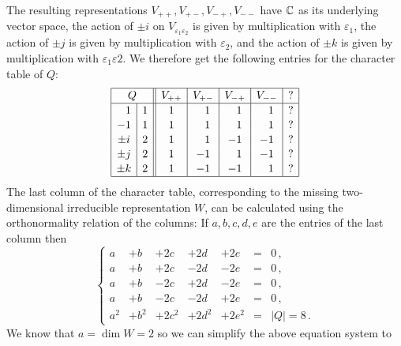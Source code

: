 \begin{example}
  The resulting representations $V_{++}, V_{+-}, V_{-+}, V_{--}$ have $\mathbb{C}$ as its underlying vector space, the action of $\pm i$ on $V_{\varepsilon_1 \varepsilon_2}$ is given by multiplication with $\varepsilon_1$, the action of $\pm j$ is given by multiplication with $\varepsilon_2$, and the action of $\pm k$ is given by multiplication with $\varepsilon_1 \varepsilon 2$.
  We therefore get the following entries for the character table of $Q$:
  \[
    \begingroup
    \renewcommand{\arraystretch}{1.1}
    \begin{array}{|c|c||c|c|c|c|c|}
      \hline
        \multicolumn{2}{|c||}{Q}
      & V_{++}
      & V_{+-}
      & V_{-+}
      & V_{--}
      & ?
      \\
      \hline
       \phantom{-}1
      & 1
      &            1
      & \phantom{-}1
      & \phantom{-}1
      & \phantom{-}1
      & ?
      \\
        -1
      & 1
      &            1
      & \phantom{-}1
      & \phantom{-}1
      & \phantom{-}1
      & ?
      \\
        \pm i
      & 2
      &            1
      & \phantom{-}1
      &           -1
      &           -1
      & ?
      \\
        \pm j
      & 2
      &            1
      &           -1
      & \phantom{-}1
      &           -1
      & ?
      \\
        \pm k
      & 2
      &            1
      &           -1
      &           -1
      & \phantom{-}1
      & ?
      \\
      \hline
    \end{array}
    \endgroup
  \]
  The last column of the character table, corresponding to the missing two-dimensional irreducible representation $W$, can be calculated using the orthonormality relation of the columns:
  If $a, b, c, d, e$ are the entries of the last column then
  \[
    \left\{
      \begin{array}{lllllcl}
        a   & + b   & + 2c    & + 2d    & + 2e    &=& 0 \,, \\
        a   & + b   & + 2c    & - 2d    & - 2e    &=& 0 \,, \\
        a   & + b   & - 2c    & + 2d    & - 2e    &=& 0 \,, \\
        a   & + b   & - 2c    & - 2d    & + 2e    &=& 0 \,, \\
        a^2 & + b^2 & + 2c^2  & + 2d^2  & + 2 e^2 &=& |Q| = 8  \,.
      \end{array}
    \right.
  \]
  We know that $a = \dim W = 2$ so we can simplify the above equation system to

\end{example}
